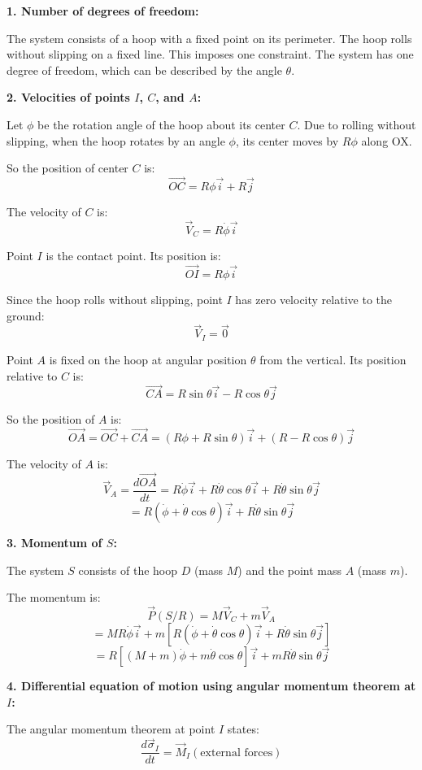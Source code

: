 \documentclass[12pt]{article}
\begin{document}
\begin{correctionbox}
\textbf{1. Number of degrees of freedom:}

The system consists of a hoop with a fixed point on its perimeter. The hoop rolls without slipping on a fixed line. This imposes one constraint. The system has one degree of freedom, which can be described by the angle $\theta$.

\textbf{2. Velocities of points $I$, $C$, and $A$:}

Let $\phi$ be the rotation angle of the hoop about its center $C$. Due to rolling without slipping, when the hoop rotates by an angle $\phi$, its center moves by $R\phi$ along OX.

So the position of center $C$ is:
$$\vec{OC} = R\phi\vec{i} + R\vec{j}$$

The velocity of $C$ is:
$$\vec{V}_C = R\dot{\phi}\vec{i}$$

Point $I$ is the contact point. Its position is:
$$\vec{OI} = R\phi\vec{i}$$

Since the hoop rolls without slipping, point $I$ has zero velocity relative to the ground:
$$\vec{V}_I = \vec{0}$$

Point $A$ is fixed on the hoop at angular position $\theta$ from the vertical. Its position relative to $C$ is:
$$\vec{CA} = R\sin\theta\vec{i} - R\cos\theta\vec{j}$$

So the position of $A$ is:
$$\vec{OA} = \vec{OC} + \vec{CA} = (R\phi + R\sin\theta)\vec{i} + (R - R\cos\theta)\vec{j}$$

The velocity of $A$ is:
$$\vec{V}_A = \frac{d\vec{OA}}{dt} = R\dot{\phi}\vec{i} + R\dot{\theta}\cos\theta\vec{i} + R\dot{\theta}\sin\theta\vec{j}$$
$$= R(\dot{\phi} + \dot{\theta}\cos\theta)\vec{i} + R\dot{\theta}\sin\theta\vec{j}$$

\textbf{3. Momentum of $S$:}

The system $S$ consists of the hoop $D$ (mass $M$) and the point mass $A$ (mass $m$).

The momentum is:
$$\vec{P}(S/R) = M\vec{V}_C + m\vec{V}_A$$
$$= MR\dot{\phi}\vec{i} + m[R(\dot{\phi} + \dot{\theta}\cos\theta)\vec{i} + R\dot{\theta}\sin\theta\vec{j}]$$
$$= R[(M + m)\dot{\phi} + m\dot{\theta}\cos\theta]\vec{i} + mR\dot{\theta}\sin\theta\vec{j}$$

\textbf{4. Differential equation of motion using angular momentum theorem at $I$:}

The angular momentum theorem at point $I$ states:
$$\frac{d\vec{\sigma}_I}{dt} = \vec{M}_I(\text{external forces})$$


\end{correctionbox}
\end{document}
